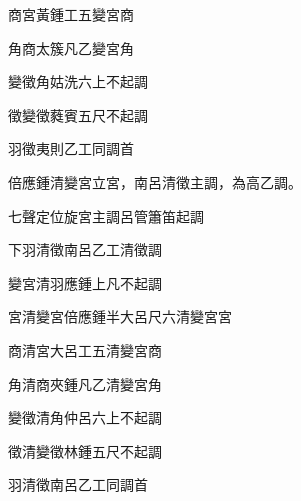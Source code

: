 \begin{pinyinscope}
商宮黃鍾工五變宮商

角商太簇凡乙變宮角

變徵角姑洗六上不起調

徵變徵蕤賓五尺不起調

羽徵夷則乙工同調首

倍應鍾清變宮立宮，南呂清徵主調，為高乙調。

七聲定位旋宮主調呂管簫笛起調

下羽清徵南呂乙工清徵調

變宮清羽應鍾上凡不起調

宮清變宮倍應鍾半大呂尺六清變宮宮

商清宮大呂工五清變宮商

角清商夾鍾凡乙清變宮角

變徵清角仲呂六上不起調

徵清變徵林鍾五尺不起調

羽清徵南呂乙工同調首


\end{pinyinscope}
